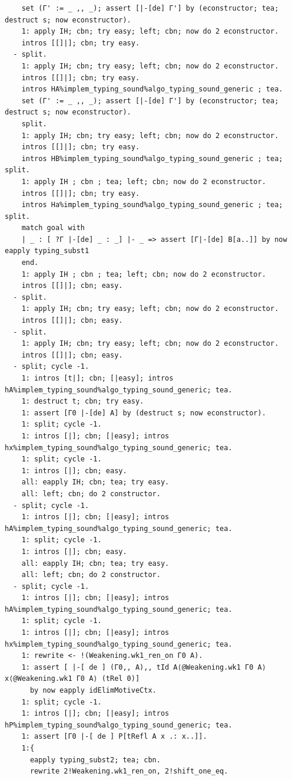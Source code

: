 \begin{lstlisting}
    set (Γ' := _ ,, _); assert [|-[de] Γ'] by (econstructor; tea; destruct s; now econstructor).
    1: apply IH; cbn; try easy; left; cbn; now do 2 econstructor.
    intros [[]|]; cbn; try easy.
  - split.
    1: apply IH; cbn; try easy; left; cbn; now do 2 econstructor.
    intros [[]|]; cbn; try easy.
    intros HA%implem_typing_sound%algo_typing_sound_generic ; tea.
    set (Γ' := _ ,, _); assert [|-[de] Γ'] by (econstructor; tea; destruct s; now econstructor).
    split.
    1: apply IH; cbn; try easy; left; cbn; now do 2 econstructor.
    intros [[]|]; cbn; try easy.
    intros HB%implem_typing_sound%algo_typing_sound_generic ; tea; split.
    1: apply IH ; cbn ; tea; left; cbn; now do 2 econstructor.
    intros [[]|]; cbn; try easy.
    intros Ha%implem_typing_sound%algo_typing_sound_generic ; tea; split.
    match goal with
    | _ : [ ?Γ |-[de] _ : _] |- _ => assert [Γ|-[de] B[a..]] by now eapply typing_subst1
    end.
    1: apply IH ; cbn ; tea; left; cbn; now do 2 econstructor.
    intros [[]|]; cbn; easy.
  - split.
    1: apply IH; cbn; try easy; left; cbn; now do 2 econstructor.
    intros [[]|]; cbn; easy.
  - split.
    1: apply IH; cbn; try easy; left; cbn; now do 2 econstructor.
    intros [[]|]; cbn; easy.
  - split; cycle -1.
    1: intros [t|]; cbn; [|easy]; intros hA%implem_typing_sound%algo_typing_sound_generic; tea.
    1: destruct t; cbn; try easy.
    1: assert [Γ0 |-[de] A] by (destruct s; now econstructor).
    1: split; cycle -1.
    1: intros [|]; cbn; [|easy]; intros hx%implem_typing_sound%algo_typing_sound_generic; tea.
    1: split; cycle -1.
    1: intros [|]; cbn; easy.
    all: eapply IH; cbn; tea; try easy.
    all: left; cbn; do 2 constructor.
  - split; cycle -1.
    1: intros [|]; cbn; [|easy]; intros hA%implem_typing_sound%algo_typing_sound_generic; tea.
    1: split; cycle -1.
    1: intros [|]; cbn; easy.
    all: eapply IH; cbn; tea; try easy.
    all: left; cbn; do 2 constructor.
  - split; cycle -1.
    1: intros [|]; cbn; [|easy]; intros hA%implem_typing_sound%algo_typing_sound_generic; tea.
    1: split; cycle -1.
    1: intros [|]; cbn; [|easy]; intros hx%implem_typing_sound%algo_typing_sound_generic; tea.
    1: rewrite <- !(Weakening.wk1_ren_on Γ0 A).
    1: assert [ |-[ de ] (Γ0,, A),, tId A⟨@Weakening.wk1 Γ0 A⟩ x⟨@Weakening.wk1 Γ0 A⟩ (tRel 0)]
      by now eapply idElimMotiveCtx.
    1: split; cycle -1.
    1: intros [|]; cbn; [|easy]; intros hP%implem_typing_sound%algo_typing_sound_generic; tea.
    1: assert [Γ0 |-[ de ] P[tRefl A x .: x..]].
    1:{ 
      eapply typing_subst2; tea; cbn.
      rewrite 2!Weakening.wk1_ren_on, 2!shift_one_eq.

\end{lstlisting}
